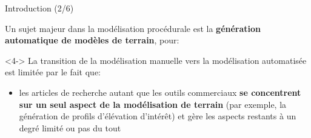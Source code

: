 \documentclass{beamer}
\begin{document}
\begin{frame}{Introduction (2/6)}

Un sujet majeur dans la modélisation procédurale est la \textbf{génération automatique de modèles de terrain}, pour:
\begin{itemize}
	\newline
\end{itemize}

\begin{uncoverenv}<4->
La transition de la modélisation manuelle vers la modélisation automatisée est limitée par le fait que:
\begin{itemize}
	\item les articles de recherche autant que les outils commerciaux \textbf{se concentrent sur un seul aspect de la modélisation de terrain} (par exemple, la génération de profils d'élévation d'intérêt) et gère les aspects restants à un degré limité ou pas du tout
\end{itemize}
\end{uncoverenv}

\end{frame}
\end{document}
